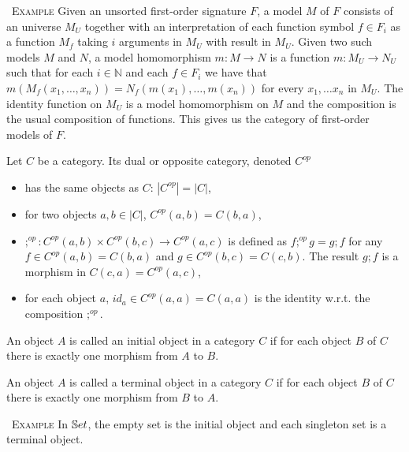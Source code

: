 \documentclass[10pt, a4paper]{isov2}
\renewenvironment{example}[0]{\ \newline \textsc{Example}\quad }{}
\begin{document}
\begin{example}
Given an unsorted first-order signature $F$,
a model $M$
of $F$
consists of an universe $M_U$
together with an interpretation of each function symbol $f \in F_i$
as a function $M_f$
taking $i$
arguments in $M_U$
with result in $M_U$.
Given two such models $M$
and $N$,
a model homomorphism $m : M \to N$
is a function $m: M_U \to N_U$
such that for each $i\in \mathbb{N}$
and each $f\in F_i$
we have that $m(M_f(x_1,\ldots, x_n)) = N_f(m(x_1), \ldots, m(x_n))$
for every $x_1,\ldots x_n$
in $M_U$.
The identity function on $M_U$
is a model homomorphism on $M$
and the composition is the usual composition of functions. This gives us
the category of first-order models of $F$.
\end{example}

\begin{definition}
Let $C$ be a category. Its dual or opposite category, denoted $C^{\mathit{op}}$ 
\begin{itemize}
  \item has the same objects as $C$: $|C^{\mathit{op}}| = |C|$,

  \item for two objects $a,b\in |C|$, $C^{\mathit{op}}(a,b) = C(b,a)$,

  \item ${;}^{\mathit{op}} : C^{\mathit{op}}(a,b) \times C^{\mathit{op}}(b,c) \to C^{\mathit{op}}(a,c)$
is defined as $f;^{\mathit{op}} g = g;f$
for any $f\in C^{\mathit{op}}(a,b) = C(b,a)$
and $g\in C^{\mathit{op}}(b,c) = C(c,b)$.
The result $g;f$ is a morphism in $C(c,a) = C^{\mathit{op}}(a,c)$,
  \item for each object $a$,
$id_a \in C^{\mathit{op}}(a,a) = C(a,a)$
is the identity w.r.t. the composition ${;}^{\mathit{op}}$.
\end{itemize}
\end{definition}

\begin{definition}
An object $A$ is called an initial object in a category 
$C$ if for each object $B$ of $C$ there is
exactly one morphism from $A$ to $B$.
\end{definition}

\begin{definition}
An object $A$ is called a terminal object in a category 
$C$ if for each object $B$ of $C$ there is
exactly one morphism from $B$ to $A$.
\end{definition}

\begin{example}
In $\mathbb{S}et$, the empty set is the initial object and each singleton set is a
terminal object.
\end{example}
\end{document}
